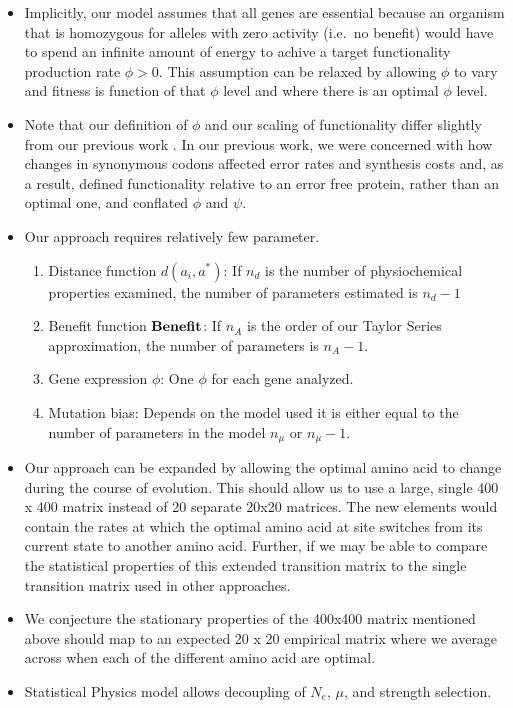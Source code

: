 \documentclass{article}
\newcommand{\Func}{\ensuremath{\text{\textbf{Benefit}}}\xspace}
\newcommand{\Ne}{\ensuremath{{N_e}}\xspace} %
\newcommand{\aopt}{\ensuremath{a^*}\xspace}
\begin{document}
\begin{itemize}
\item Implicitly, our model assumes that all genes are essential because an organism that is homozygous for alleles with zero activity (i.e.~no benefit) would have to spend an infinite amount of energy to achive a target functionality production rate $\phi > 0$.
This assumption can be relaxed by allowing $\phi$ to vary and fitness is function of that $\phi$ level and where there is an optimal $\phi$ level.
\item Note that our definition of $\phi$ and our scaling of functionality differ slightly from our previous work \citep{Gilchrist07,GilchristEtAl09,ShahAndGilchrist11,GilchristEtAl15a}.
In our previous work, we were concerned with how changes in synonymous codons affected error rates and synthesis costs and, as a result, defined functionality relative to an error free protein, rather than an optimal one, and conflated $\phi$ and $\psi$.
\item Our approach requires relatively few parameter. 
  \begin{enumerate}
  \item Distance function $d(a_i, \aopt)$: If $n_d$ is the number of physiochemical properties examined, the number of parameters estimated is $n_d - 1$
  \item Benefit function $\Func$: If $n_A$ is the order of our Taylor Series approximation, the number of parameters is $n_A-1$.
  \item Gene expression $\phi$: One $\phi$ for each gene analyzed.
  \item Mutation bias: Depends on the model used it is either equal to the number of parameters in the model $n_\mu$ or $n_\mu-1$.
  \end{enumerate}
\item Our approach can be expanded by allowing the optimal amino acid to change during the course of evolution.
This should allow us to use a large, single 400 x 400 matrix instead of 20 separate 20x20 matrices.
The new elements would contain the rates at which the optimal amino acid at site switches from its current state to another amino acid.
Further, if we may be able to compare the statistical properties of this extended transition matrix to the single transition matrix used in other approaches.
\item We conjecture the stationary properties of the 400x400 matrix mentioned above should map to an expected 20 x 20 empirical matrix where we average across when each of the different amino acid are optimal.
\item Statistical Physics model allows decoupling of \Ne, $\mu$, and strength selection.
\end{itemize}
\end{document}
